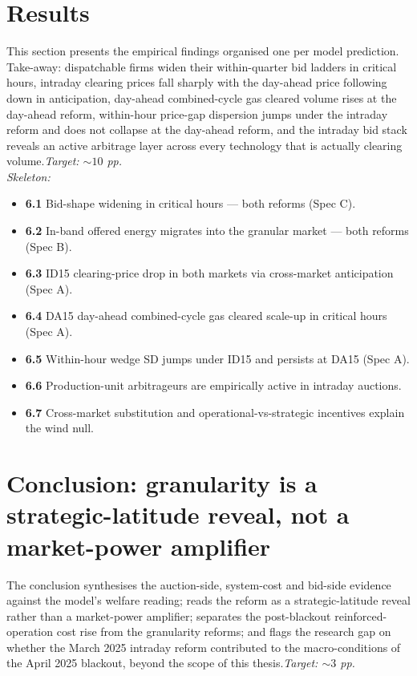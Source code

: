 \documentclass[11pt]{article}
\begin{document}
\section{Results}

This section presents the empirical findings organised one per model prediction. Take-away: dispatchable firms widen their within-quarter bid ladders in critical hours, intraday clearing prices fall sharply with the day-ahead price following down in anticipation, day-ahead combined-cycle gas cleared volume rises at the day-ahead reform, within-hour price-gap dispersion jumps under the intraday reform and does not collapse at the day-ahead reform, and the intraday bid stack reveals an active arbitrage layer across every technology that is actually clearing volume.\hfill\emph{Target: $\sim 10$ pp.}
\\\emph{Skeleton:}
\begin{itemize}
  \item \textbf{6.1} Bid-shape widening in critical hours --- both reforms (Spec C).
  \item \textbf{6.2} In-band offered energy migrates into the granular market --- both reforms (Spec B).
  \item \textbf{6.3} ID15 clearing-price drop in both markets via cross-market anticipation (Spec A).
  \item \textbf{6.4} DA15 day-ahead combined-cycle gas cleared scale-up in critical hours (Spec A).
  \item \textbf{6.5} Within-hour wedge SD jumps under ID15 and persists at DA15 (Spec A).
  \item \textbf{6.6} Production-unit arbitrageurs are empirically active in intraday auctions.
  \item \textbf{6.7} Cross-market substitution and operational-vs-strategic incentives explain the wind null.
\end{itemize}

\section{Conclusion: granularity is a strategic-latitude reveal, not a market-power amplifier}

The conclusion synthesises the auction-side, system-cost and bid-side evidence against the model's welfare reading; reads the reform as a strategic-latitude reveal rather than a market-power amplifier; separates the post-blackout reinforced-operation cost rise from the granularity reforms; and flags the research gap on whether the March 2025 intraday reform contributed to the macro-conditions of the April 2025 blackout, beyond the scope of this thesis.\hfill\emph{Target: $\sim 3$ pp.}
\end{document}
